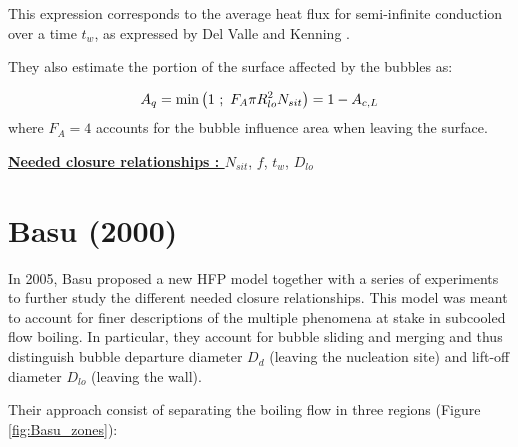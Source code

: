 This expression corresponds to the average heat flux for semi-infinite conduction over a time $t_{w}$, as expressed by Del Valle and Kenning \cite{DelValle}.

They also estimate the portion of the surface affected by the bubbles as:

\begin{align}
A_{q}=\mathrm{min}\left( 1\ ;\ F_{A}\pi R_{lo}^{2} N_{sit} \right)=1-A_{c,L}
\label{eq:HFP_KP_AQ}
\end{align}
where $F_{A}=4$ accounts for the bubble influence area when leaving the surface.

\npar

\textbf{\underline{Needed closure relationships : }} $N_{sit}$, $f$, $t_{w}$, $D_{lo}$ 


\section{Basu (2000)}

In 2005, Basu \etal \cite{Basu2005, Basu2005a} proposed a new HFP model together with a series of experiments to further study the different needed closure relationships. This model was meant to account for finer descriptions of the multiple phenomena at stake in subcooled flow boiling. In particular, they account for bubble sliding and merging and thus distinguish bubble departure diameter $D_{d}$ (leaving the nucleation site) and lift-off diameter $D_{lo}$ (leaving the wall).

Their approach consist of separating the boiling flow in three regions (Figure \ref{fig:Basu_zones}):

